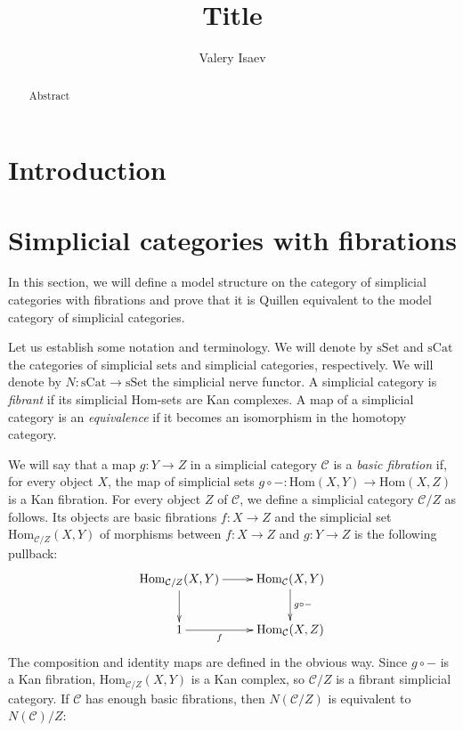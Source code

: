 \documentclass[reqno]{amsart}
\theoremstyle{definition}
\theoremstyle{remark}
\newcommand{\fs}[1]{\mathrm{#1}}
\newcommand{\Hom}{\fs{Hom}}
\newcommand{\cat}[1]{\mathcal{#1}}
\newcommand{\C}{\cat{C}}
\newcommand{\sSet}{\fs{sSet}}
\newcommand{\sCat}{\fs{sCat}}
\numberwithin{figure}{section}
\begin{document}
\title{Title}

\author{Valery Isaev}

\begin{abstract}
Abstract
\end{abstract}

\maketitle

\section{Introduction}

\section{Simplicial categories with fibrations}

In this section, we will define a model structure on the category of simplicial categories with fibrations and prove that it is Quillen equivalent to the model category of simplicial categories.

Let us establish some notation and terminology.
We will denote by $\sSet$ and $\sCat$ the categories of simplicial sets and simplicial categories, respectively.
We will denote by $N : \sCat \to \sSet$ the simplicial nerve functor.
A simplicial category is \emph{fibrant} if its simplicial $\Hom$-sets are Kan complexes.
A map of a simplicial category is an \emph{equivalence} if it becomes an isomorphism in the homotopy category.

We will say that a map $g : Y \to Z$ in a simplicial category $\C$ is a \emph{basic fibration} if, for every object $X$, the map of simplicial sets $g \circ - : \Hom(X,Y) \to \Hom(X,Z)$ is a Kan fibration.
For every object $Z$ of $\C$, we define a simplicial category $\C/Z$ as follows.
Its objects are basic fibrations $f : X \to Z$ and the simplicial set $\Hom_{\C/Z}(X,Y)$ of morphisms between $f : X \to Z$ and $g : Y \to Z$ is the following pullback:
\[ \xymatrix{ \Hom_{\C/Z}(X,Y) \ar[r] \ar[d] & \Hom_\C(X,Y) \ar[d]^{g \circ -} \\
              1 \ar[r]_-f                    & \Hom_\C(X,Z)
            } \]
The composition and identity maps are defined in the obvious way.
Since $g \circ -$ is a Kan fibration, $\Hom_{\C/Z}(X,Y)$ is a Kan complex, so $\C/Z$ is a fibrant simplicial category.
If $\C$ has enough basic fibrations, then $N(\C/Z)$ is equivalent to $N(\C)/Z$:
\end{document}
